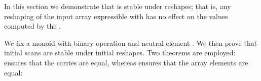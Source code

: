 In this section we demonstrate that  is stable under reshapes; that
is, any reshaping of the input array expressible with  has no
effect on the values computed by the .

We fix a monoid with binary operation  and neutral element
.  We then prove that initial scans are stable under initial reshapes.
Two theorems are employed:  ensures that the carries are equal,
whereas  ensures that the array elements are equal:
\begin{code}%
\>[0][@{}l@{\AgdaIndent{1}}]%
\>[2]\AgdaSpace{}%
\AgdaSymbol{:}\AgdaSpace{}%
\AgdaSymbol{(}\AgdaSpace{}%
\AgdaSymbol{:}\AgdaSpace{}%
\AgdaSpace{}%
\AgdaSpace{}%
\AgdaSymbol{)}\AgdaSpace{}%
\AgdaSymbol{(}\AgdaSpace{}%
\AgdaSymbol{:}\AgdaSpace{}%
\AgdaSpace{}%
\AgdaSpace{}%
\AgdaSymbol{)}\<%
\\
\>[2][@{}l@{\AgdaIndent{0}}]%
\>[6]\AgdaSpace{}%
\AgdaSpace{}%
\AgdaSpace{}%
\AgdaSpace{}%
\AgdaSpace{}%
\AgdaSymbol{(}\AgdaSpace{}%
\AgdaSpace{}%
\AgdaSymbol{)}\AgdaSpace{}%
\AgdaSpace{}%
\AgdaSpace{}%
\AgdaSpace{}%
\AgdaSpace{}%
\AgdaSpace{}%
\<%
\\
%
\>[2]\AgdaSpace{}%
\AgdaSymbol{:}\AgdaSpace{}%
\AgdaSymbol{(}\AgdaSpace{}%
\AgdaSymbol{:}\AgdaSpace{}%
\AgdaSpace{}%
\AgdaSpace{}%
\AgdaSymbol{)}\AgdaSpace{}%
\AgdaSymbol{(}\AgdaSpace{}%
\AgdaSymbol{:}\AgdaSpace{}%
\AgdaSpace{}%
\AgdaSpace{}%
\AgdaSymbol{)}\<%
\\
\>[2][@{}l@{\AgdaIndent{0}}]%
\>[6]\AgdaSpace{}%
\AgdaSpace{}%
\AgdaSpace{}%
\AgdaSpace{}%
\AgdaSpace{}%
\AgdaSymbol{(}\AgdaSpace{}%
\AgdaSpace{}%
\AgdaSymbol{)}\AgdaSpace{}%
\AgdaSpace{}%
\AgdaSpace{}%
\AgdaSpace{}%
\AgdaSymbol{(}\AgdaSpace{}%
\AgdaSpace{}%
\AgdaSpace{}%
\AgdaSpace{}%
\AgdaSymbol{)}\<%
\end{code}
